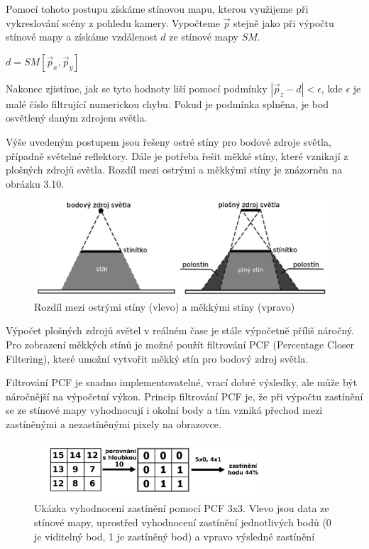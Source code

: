\documentclass[11pt,twoside,a4paper]{book}
\begin{document}
Pomocí tohoto postupu získáme stínovou mapu, kterou využijeme při vykreslování scény z pohledu kamery. Vypočteme $\vec{p}$ stejně jako při výpočtu stínové mapy a získáme vzdálenost $d$ ze stínové mapy $SM$.
\begin{center}
$d = SM[\vec{p}_x, \vec{p}_y]$
\end{center}

Nakonec zjistíme, jak se tyto hodnoty liší pomocí podmínky $|\vec{p}_z - d| < \epsilon$, kde $\epsilon$ je malé číslo filtrující numerickou chybu. Pokud je podmínka splněna, je bod osvětlený daným zdrojem světla.
\bigskip

Výše uvedeným postupem jsou řešeny ostré stíny pro bodové zdroje světla, případně světelné reflektory. Dále je potřeba řešit měkké stíny, které vznikají z plošných zdrojů světla. Rozdíl mezi ostrými a měkkými stíny je znázorněn na obrázku 3.10.

\begin{center}
\begin{figure}[h]
\includegraphics[width=110mm]{figures/shadows-pa.png}
\caption{Rozdíl mezi ostrými stíny (vlevo) a měkkými stíny (vpravo)}
\end{figure}
\end{center}

Výpočet plošných zdrojů světel v reálném čase je stále výpočetně příliš náročný. Pro zobrazení měkkých stínů je možné použít filtrování PCF (Percentage Closer Filtering), které umožní vytvořit měkký stín pro bodový zdroj světla.

Filtrování PCF je snadno implementovatelné, vrací dobré výsledky, ale může být náročnější na výpočetní výkon. Princip filtrování PCF je, že při výpočtu zastínění se ze stínové mapy vyhodnocují i okolní body a tím vzniká přechod mezi zastíněnými a nezastíněnými pixely na obrazovce.

\begin{center}
\begin{figure}[h]
\includegraphics[width=85mm]{figures/pcf.png}
\caption{Ukázka vyhodnocení zastínění pomocí PCF 3x3. Vlevo jsou data ze stínové mapy, uprostřed vyhodnocení zastínění jednotlivých bodů (0 je viditelný bod, 1 je zastíněný bod) a vpravo výsledné zastínění}
\end{figure}
\end{center}
\end{document}
